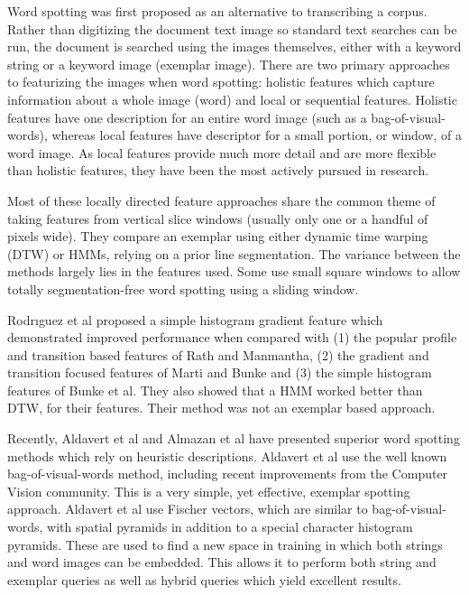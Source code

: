 \documentclass[ms]{byuprop}
\begin{document}
Word spotting was first proposed as an alternative to transcribing a corpus. Rather than digitizing the document text image so standard text searches can be run, the document is searched using the images themselves, either with a keyword string or a keyword image (exemplar image). There are two primary approaches to featurizing the images when word spotting: holistic features which capture information about a whole image (word) and local or sequential features\cite{Rodrıguez2008}. Holistic features have one description for an entire word image (such as a bag-of-visual-words), whereas local features have descriptor for a small portion, or window, of a word image. As local features provide much more detail and are more flexible than holistic features, they have been the most actively pursued in research.

Most of these locally directed feature approaches share the common theme of taking features from vertical slice windows (usually only one or a handful of pixels wide). They compare an exemplar using either dynamic time warping (DTW) or HMMs, relying on a prior line segmentation. The variance between the methods largely lies in the features used. Some use small square windows to allow totally segmentation-free word spotting using a sliding window\cite{Rothacker2013}.

Rodr{\i}guez et al\cite{Rodrıguez2008} proposed a simple histogram gradient feature which demonstrated improved performance when compared with (1) the popular profile and transition based features of Rath and Manmantha\cite{Rath2003}, (2) the gradient and transition focused features of Marti and Bunke\cite{Marti2001} and (3) the simple histogram features of Bunke et al\cite{Bunke2004}. They also showed that a HMM worked better than DTW, for their features. Their method was not an exemplar based approach.

Recently, Aldavert et al\cite{Aldavert2015} and Almazan et al\cite{Almazan2014} have presented superior word spotting methods which rely on heuristic descriptions. Aldavert et al use the well known bag-of-visual-words method, including recent improvements from the Computer Vision community. This is a very simple, yet effective, exemplar spotting approach. Aldavert et al use Fischer vectors, which are similar to bag-of-visual-words, with spatial pyramids in addition to a special character histogram pyramids. These are used to find a new space in training in which both strings and word images can be embedded. This allows it to perform both string and exemplar queries as well as hybrid queries which yield excellent results.
\end{document}
